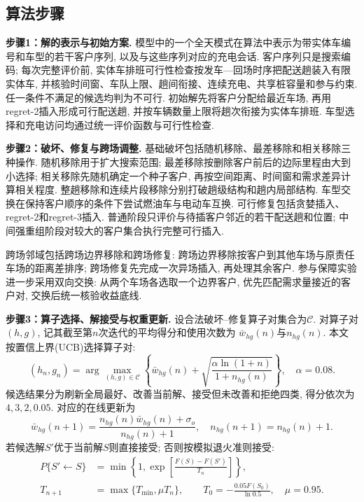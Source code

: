 \documentclass{setp-new}
\begin{document}


\subsection{算法步骤}

\textbf{步骤1：解的表示与初始方案.}
模型中的一个全天模式在算法中表示为带实体车编号和车型的若干客户序列,
以及与这些序列对应的充电会话.
客户序列只是搜索编码; 每次完整评价前,
实体车排班可行性检查按发车—回场时序把配送趟装入有限实体车,
并核验时间窗、车队上限、趟间衔接、连续充电、共享桩容量和参与约束.
任一条件不满足的候选均判为不可行.
初始解先将客户分配给最近车场, 再用regret-2插入形成可行配送趟,
并按车辆数量上限将趟次衔接为实体车排班.
车型选择和充电访问均通过统一评价函数与可行性检查.

\textbf{步骤2：破坏、修复与跨场调整.}
基础破坏包括随机移除、最差移除和相关移除\cite{ref:67}三种操作.
随机移除用于扩大搜索范围;
最差移除按删除客户前后的边际里程由大到小选择;
相关移除先随机确定一个种子客户,
再按空间距离、时间窗和需求差异计算相关程度.
整趟移除和连续片段移除分别打破趟级结构和趟内局部结构.
车型交换在保持客户顺序的条件下尝试燃油车与电动车互换.
可行修复包括贪婪插入、regret-2和regret-3插入.
普通阶段只评价与待插客户邻近的若干配送趟和位置;
中间强重组阶段对较大的客户集合执行完整可行插入.

跨场邻域包括跨场边界移除和跨场修复:
跨场边界移除按客户到其他车场与原责任车场的距离差排序;
跨场修复先完成一次异场插入, 再处理其余客户.
参与保障实验进一步采用双向交换:
从两个车场各选取一个边界客户, 优先匹配需求量接近的客户对,
交换后统一核验收益底线.

\textbf{步骤3：算子选择、解接受与权重更新.}
设合法破坏--修复算子对集合为$\mathcal C$.
对算子对$(h,g)$, 记其截至第$n$次迭代的平均得分和使用次数为
$\bar w_{hg}(n)$与$n_{hg}(n)$.
本文按置信上界(UCB)选择算子对\cite{ref:68}:
\begin{equation}
(h_n,g_n)=\arg\max_{(h,g)\in\mathcal C}
\left\{\bar w_{hg}(n)+\sqrt{\frac{\alpha\ln(1+n)}{1+n_{hg}(n)}}\right\},
\quad \alpha=0.08.
\label{eq:ucb-selection}
\end{equation}
候选结果分为刷新全局最好、改善当前解、接受但未改善和拒绝四类,
得分依次为$4,3,2,0.05$.
对应的在线更新为
\begin{equation}
\bar w_{hg}(n+1)=\frac{n_{hg}(n)\bar w_{hg}(n)+\sigma_o}{n_{hg}(n)+1},
\quad n_{hg}(n+1)=n_{hg}(n)+1.
\label{eq:ucb-update}
\end{equation}
若候选解$S'$优于当前解$S$则直接接受; 否则按模拟退火准则接受\cite{ref:69}:
\begin{equation}
\begin{aligned}
P\{S'\leftarrow S\}&=\min\left\{1,
\exp\left[\frac{F(S)-F(S')}{T_n}\right]\right\},\\
T_{n+1}&=\max\{T_{\min},\mu T_n\},\qquad
T_0=-\frac{0.05F(S_0)}{\ln0.5},\quad \mu=0.95.
\end{aligned}
\label{eq:sa-acceptance}
\end{equation}
\end{document}
